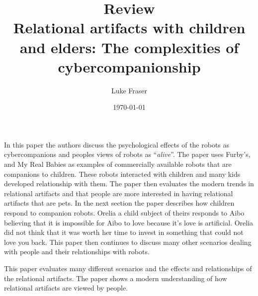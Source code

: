 \documentclass{article}
\begin{document}
\title{{\large Review} \\ Relational artifacts with children and elders: The complexities of cybercompanionship}
\author{Luke Fraser}
\date{\today}
\maketitle

\begingroup
\renewcommand{\section}[2]{}


\endgroup

\section*{Summary}
In this paper the authors discuss the psychological effects of the robots as cybercompanions and peoples views of robots as ``\emph{alive}''. The paper uses Furby's, and My Real Babies as examples of commercially available robots that are companions to children. These robots interacted with children and many kids developed relationship with them. The paper then evaluates the modern trends in relational artifacts and that people are more interested in having relational artifacts that are pets. In the next section the paper describes how children respond to companion robots. Orelia a child subject of theirs responds to Aibo believing that it is impossible for Aibo to love because it's love is artificial. Orelia did not think that it was worth her time to invest in something that could not love you back. This paper then continues to discuss many other scenarios dealing with people and their relationships with robots.
\section*{Strengths}
This paper evaluates many different scenarios and the effects and relationships of the relational artifacts. The paper shows a modern understanding of how relational artifacts are viewed by people.
\end{document}
